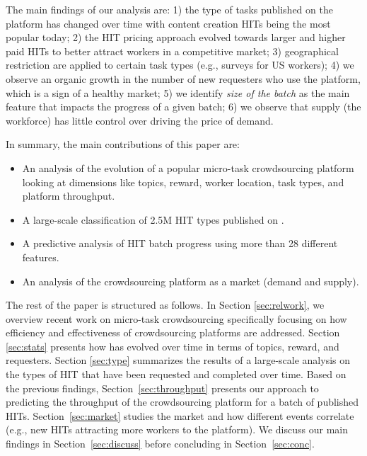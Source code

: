 The main findings of our analysis are: 1) the type of tasks published on the platform has changed over time with content creation HITs being the most popular today; 2) the HIT pricing approach evolved towards larger and higher paid HITs to better attract workers in a competitive market; 3) geographical restriction are applied to certain task types (e.g., surveys for US workers); 4) we observe an organic growth in the number of new requesters who use the platform, which is a sign of a healthy market; 5) we identify \emph{size of the batch} as the main feature that impacts the progress of a given batch; 6) we observe that supply (the workforce) has little control over driving the price of demand.

In summary, the main contributions of this paper are:
\begin{itemize}[noitemsep,topsep=0pt,parsep=0pt,partopsep=0pt]

	\item An analysis of the evolution of a popular micro-task crowdsourcing platform looking at dimensions like topics, reward, worker location, task types, and platform throughput.

	\item A large-scale classification of 2.5M HIT types published on \amt{}.

	\item A predictive analysis of HIT batch progress using more than 28 different features.
	
	\item An analysis of the crowdsourcing platform as a market (demand and supply).
	
\end{itemize}


The rest of the paper is structured as follows.
In Section \ref{sec:relwork}, we overview recent work on micro-task crowdsourcing specifically focusing on how  efficiency and effectiveness  of crowdsourcing platforms are addressed.
Section \ref{sec:stats} presents how \amt{} has evolved over time in terms of topics, reward, and requesters.
Section \ref{sec:type} summarizes the results of a large-scale analysis on the types of HIT that have been requested and completed over time.
Based on the previous findings, Section~\ref{sec:throughput} presents our approach to predicting the throughput of the crowdsourcing platform for a batch of published HITs.
Section~\ref{sec:market} studies the \amt{} market and how different events correlate (e.g., new HITs attracting more workers to the platform).
We discuss our main findings in Section~\ref{sec:discuss} before concluding in 
Section~\ref{sec:conc}.


